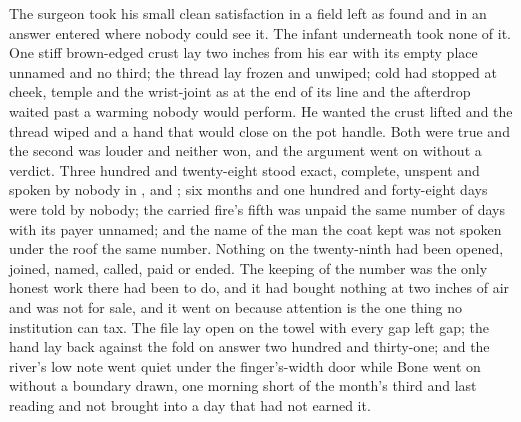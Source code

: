 The surgeon took his small clean satisfaction in a field left as found and in an answer entered where nobody could see it. The infant underneath took none of it. One stiff brown-edged crust lay two inches from his ear with its empty place unnamed and no third; the thread lay frozen and unwiped; cold had stopped at cheek, temple and the wrist-joint as at the end of its line and the afterdrop waited past a warming nobody would perform. He wanted the crust lifted and the thread wiped and a hand that would close on the pot handle. Both were true and the second was louder and neither won, and the argument went on without a verdict. Three hundred and twenty-eight stood exact, complete, unspent and spoken by nobody in ,  and ; six months and one hundred and forty-eight days were told by nobody; the carried fire's fifth was unpaid the same number of days with its payer unnamed; and the name of the man the coat kept was not spoken under the roof the same number. Nothing on the twenty-ninth had been opened, joined, named, called, paid or ended. The keeping of the number was the only honest work there had been to do, and it had bought nothing at two inches of air and was not for sale, and it went on because attention is the one thing no institution can tax. The file lay open on the towel with every gap left gap; the hand lay back against the fold on answer two hundred and thirty-one; and the river's low note went quiet under the finger's-width door while Bone went on without a boundary drawn, one morning short of the month's third and last reading and not brought into a day that had not earned it.
